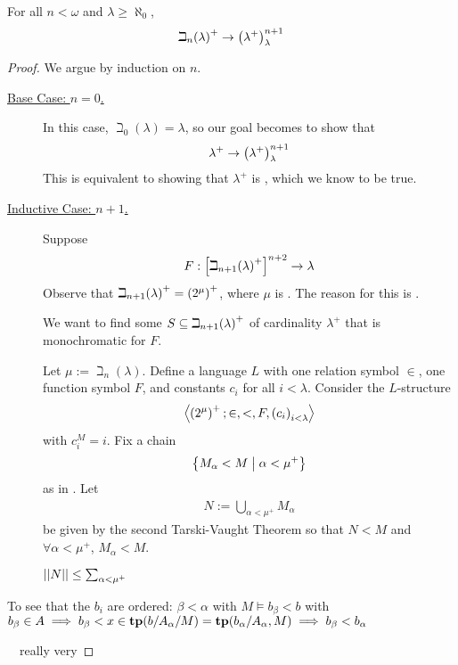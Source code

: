 \begin{boxtheorem}
    For all $n < \omega$ and $\lambda \geq \aleph_0$,
    \begin{align*}
        \beth_n\!\left( \lambda \right)^+ \to \left( \lambda^+ \right)_{\lambda}^{n + 1}
    \end{align*}
\end{boxtheorem}
\begin{proof}
    We argue by induction on $n$.

    \begin{description}
        \item[\underline{Base Case: $n = 0$.}]
        In this case, $\beth_0(\lambda) = \lambda$, so our goal becomes to show that
        \begin{align*}
            \lambda^+ \to \left( \lambda^+ \right)_{\lambda}^{n + 1}
        \end{align*}
        This is equivalent to showing that $\lambda^+$ is \sorry, which we know to be true.

        \item[\underline{Inductive Case: $n + 1$.}]
        Suppose
        \begin{align*}
            F : \left[ \beth_{n+1}\!\left( \lambda \right)^+ \right]^{n + 2} \to \lambda
        \end{align*}
        Observe that $\beth_{n+1}\!\left( \lambda \right)^+ = \left( 2^{\mu} \right)^+$, where $\mu$ is \sorry. The reason for this is \sorry.

        We want to find some $S \subseteq \beth_{n+1}\!\left( \lambda \right)^+$ of cardinality $\lambda^+$ that is monochromatic for $F$.

        Let $\mu := \beth_n(\lambda)$. Define a language $L$ with one relation symbol $\in$, one function symbol $F$, and constants $c_i$ for all $i < \lambda$. Consider the $L$-structure
        \begin{align*}
            \left\langle \left( 2^{\mu} \right)^+; \in, <, F, \left( c_i \right)_{i < \lambda} \right\rangle
        \end{align*}
        with $c_i^M = i$. Fix a chain
        \begin{align*}
            \left\{ M_{\alpha} < M \; \middle\vert \; \alpha < \mu^+ \right\}
        \end{align*}
        as in . Let
        \begin{align*}
            N := \bigcup_{\alpha < \mu^+} M_{\alpha}
        \end{align*}
        be given by the second Tarski-Vaught Theorem so that $N < M$ and $\forall \alpha < \mu^+$, $M_{\alpha} < M$.

        $\left\lvert \left\lvert N \right\rvert \right\rvert \leq \sum_{\alpha < \mu^+}$
    \end{description}
    To see that the $b_i$ are ordered: $\beta <\alpha$ with $M\models b_{\beta}<b$ with $b_{\beta}\in A\implies b_{\beta}<x\in \mathbf{tp}(b/A_{\alpha}/M)=\textbf{tp}(b_{\alpha}/A_{\alpha},M)\implies b_{\beta}<b_{\alpha}$

    \sorry\ \sorry\ really very \sorry
\end{proof}

